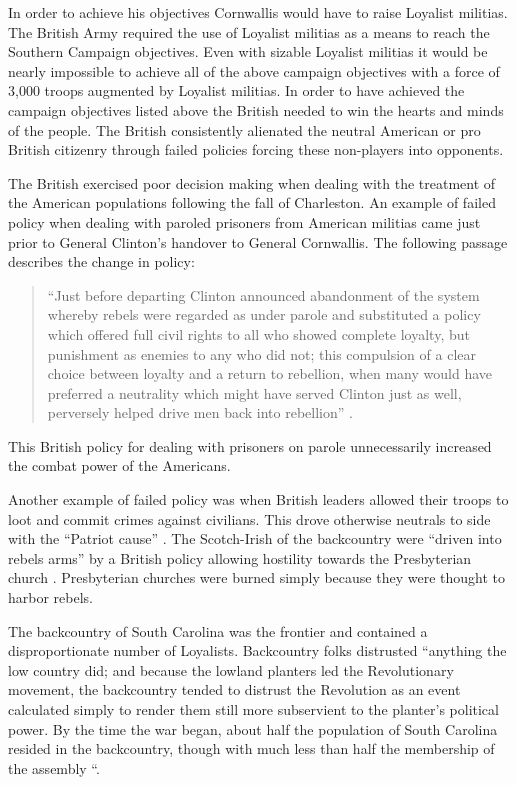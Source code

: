In order to achieve his objectives Cornwallis would have to raise Loyalist
militias.  The British Army required the use of Loyalist militias as a means to
reach the Southern Campaign objectives.  Even with sizable Loyalist militias it
would be nearly impossible to achieve all of the above campaign objectives with
a force of 3,000 troops augmented by Loyalist militias.   In order to have
achieved the campaign objectives listed above the British needed to win the
hearts and minds of the people.  The British consistently alienated the neutral
American or pro British citizenry through failed policies forcing these
non-players into opponents.  

The British exercised poor decision making when dealing with the treatment of
the American populations following the fall of Charleston.  An example of failed
policy when dealing with paroled prisoners from American militias came just
prior to General Clinton’s handover to General Cornwallis.  The following
passage describes the change in policy:

\begin{quote} “Just before departing Clinton announced abandonment of the system
  whereby rebels were regarded as under parole and substituted a policy which
  offered full civil rights to all who showed complete loyalty, but punishment
  as enemies to any who did not; this compulsion of a clear choice between
  loyalty and a return to rebellion, when many would have preferred a neutrality
  which might have served Clinton just as well, perversely helped drive men back
  into rebellion” \cite[p.12]{weigley_partisan_1970}.  \end{quote} 

This British policy for dealing with prisoners on parole unnecessarily increased
the combat power of the Americans.

Another example of failed policy was when British leaders allowed their troops
to loot and commit crimes against civilians.  This drove otherwise neutrals to
side with the “Patriot cause” \cite[p.13]{weigley_partisan_1970}.   The Scotch-Irish of the
backcountry were “driven into rebels arms” by a British policy allowing
hostility towards the Presbyterian church \cite[p.13]{weigley_partisan_1970}.  Presbyterian
churches were burned simply because they were thought to harbor rebels.  

The backcountry of South Carolina was the frontier and contained a
disproportionate number of Loyalists.  Backcountry folks distrusted “anything the
low country did; and because the lowland planters led the Revolutionary
movement, the backcountry tended to distrust the Revolution as an event
calculated simply to render them still more subservient to the planter’s
political power.  By the time the war began, about half the population of South
Carolina resided in the backcountry, though with much less than half the
membership of the assembly “\cite[p.11]{weigley_partisan_1970}.  

